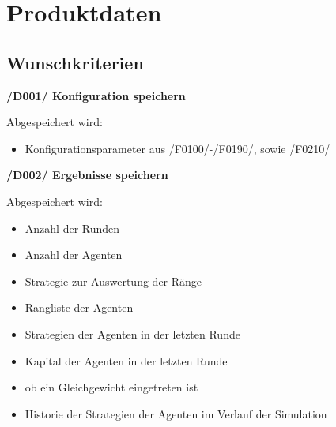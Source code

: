 \section{Produktdaten}

\subsection{Wunschkriterien}

\textbf{/D001/ Konfiguration speichern}

Abgespeichert wird:
\begin{itemize}
\item Konfigurationsparameter aus /F0100/-/F0190/, sowie /F0210/
\end{itemize}

\textbf{/D002/ Ergebnisse speichern}	

Abgespeichert wird:
\begin{itemize}
\item Anzahl der Runden
\item Anzahl der Agenten
\item Strategie zur Auswertung der Ränge
\item Rangliste der Agenten
\item Strategien der Agenten in der letzten Runde
\item Kapital der Agenten in der letzten Runde
\item ob ein Gleichgewicht eingetreten ist
\item Historie der Strategien der Agenten im Verlauf der Simulation
\end{itemize}